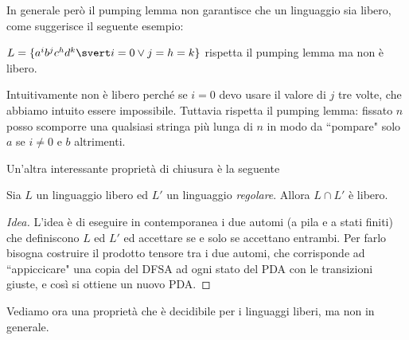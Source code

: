 \documentclass[12pt]{article}
\numberwithin{theorem}{subsection}
\begin{document}
In generale però il pumping lemma non garantisce che un linguaggio sia libero, come suggerisce il seguente esempio:
\begin{example}
	$L = \lbrace a^i b^j c^h d^k \svert i = 0 \lor j = h = k \rbrace$ rispetta il pumping lemma ma non è libero.
	
	Intuitivamente non è libero perché se $i = 0$ devo usare il valore di $j$ tre volte, che abbiamo intuito essere impossibile. Tuttavia rispetta il pumping lemma: fissato $n$ posso scomporre una qualsiasi stringa più lunga di $n$ in modo da ``pompare" solo $a$ se $i \neq 0$ e $b$ altrimenti.
\end{example}

Un'altra interessante proprietà di chiusura è la seguente
\begin{prop}
	Sia $L$ un linguaggio libero ed $L'$ un linguaggio \textit{regolare}. Allora $L \cap L'$ è libero.
\end{prop}
\begin{proof}[Idea]
	L'idea è di eseguire in contemporanea i due automi (a pila e a stati finiti) che definiscono $L$ ed $L'$ ed accettare se e solo se accettano entrambi. Per farlo bisogna costruire il prodotto tensore tra i due automi, che corrisponde ad ``appiccicare" una copia del DFSA ad ogni stato del PDA con le transizioni giuste, e così si ottiene un nuovo PDA.
\end{proof}

Vediamo ora una proprietà che è decidibile per i linguaggi liberi, ma non in generale.
\end{document}
